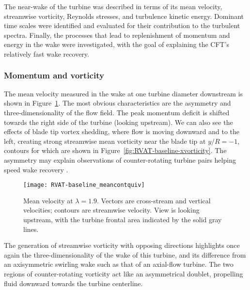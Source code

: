 The near-wake of the turbine was described in terms of its mean velocity,
streamwise vorticity, Reynolds stresses, and turbulence kinetic energy. Dominant
time scales were identified and evaluated for their contribution to the turbulent
spectra. Finally, the processes that lead to replenishment of momentum and
energy in the wake were investigated, with the goal of explaining the CFT's
relatively fast wake recovery.


\subsubsection{Momentum and vorticity}

The mean velocity measured in the wake at one turbine diameter downstream is
shown in Figure~\ref{fig:RVAT-baseline-meancontquiv}. The most obvious
characteristics are the asymmetry and three-dimensionality of the flow field.
The peak momentum deficit is shifted towards the right side of the turbine
(looking upstream). We can also see the effects of blade tip vortex shedding,
where flow is moving downward and to the left, creating strong streamwise mean
vorticity near the blade tip at $y/R=-1$, contours for which are shown in
Figure~\ref{fig:RVAT-baseline-xvorticity}. The asymmetry may explain
observations of counter-rotating turbine pairs helping speed wake recovery
\cite{Dabiri2011}.

\begin{figure}
    \centering
    
    \texttt{[image: RVAT-baseline\_meancontquiv]}
    
    \caption{Mean velocity at $\lambda=1.9$. Vectors are cross-stream and
        vertical velocities; contours are streamwise velocity. View is looking
        upstream, with the turbine frontal area indicated by the solid gray lines.}
    
    \label{fig:RVAT-baseline-meancontquiv}
\end{figure}

The generation of streamwise vorticity with opposing directions highlights once
again the three-dimensionality of the wake of this turbine, and its difference
from an axisymmetric swirling wake such as that of an axial-flow turbine. The
two regions of counter-rotating vorticity act like an asymmetrical doublet,
propelling fluid downward towards the turbine centerline.

